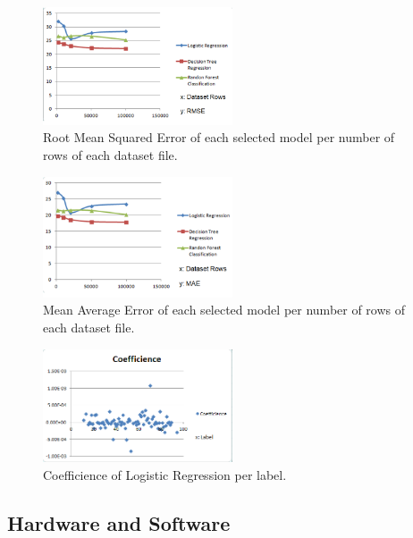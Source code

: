 \begin{figure}[h!]
  \includegraphics[width=0.5\textwidth]{grafima_rmse}
\caption{Root Mean Squared Error of each selected model per number of rows of each dataset file.}
\end{figure}

\begin{figure}[h!]
  \includegraphics[width=0.5\textwidth]{grafima_mae}
\caption{Mean Average Error of each selected model per number of rows of each dataset file.}
\end{figure}

\begin{figure}[h!]
  \includegraphics[width=0.5\textwidth]{coefficience}
\caption{Coefficience of Logistic Regression per label.}
\end{figure}

\subsection{Hardware and Software}

